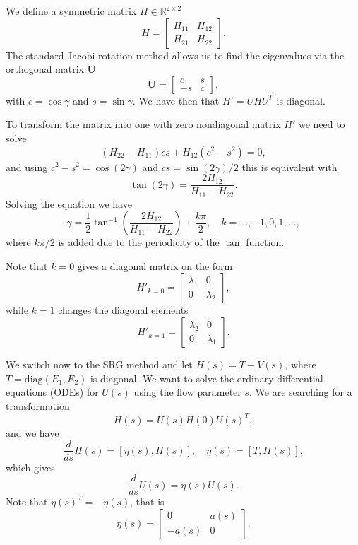 We define a  symmetric matrix  $H\in {\mathbb{R}}^{2\times 2}$
\[ 
H = \begin{bmatrix} H_{11} & H_{12} \\ H_{21} & H_{22}\end{bmatrix}. 
\]
The standard Jacobi rotation method allows us to find the eigenvalues via the orthogonal matrix
$\mathbf{U}$ 
\[ 
\mathbf{U} = \begin{bmatrix} c & s \\ -s & c
\end{bmatrix}, 
\]
with $c = \cos \gamma$ and $s = \sin \gamma$. We have then that  $H' = UHU^T$ is diagonal. 

To transform the matrix into one with zero  nondiagonal matrix $H'$ we need to solve
\[ 
(H_{22} - H_{11})cs + H_{12}(c^2 - s^2) = 0, 
\]
and using $c^2-s^2 = \cos(2\gamma)$ and $cs = \sin(2\gamma)/2$
this is equivalent with 
\[ \tan(2\gamma) = \frac{2 H_{12}}{H_{11}-H_{22}}. \]
Solving the equation we have
\begin{equation} 
\gamma = \frac{1}{2} \tan^{-1} \left( \frac{2H_{12}}{H_{11}-H_{22}}
\right) + \frac{k\pi}{2}, \quad k=\ldots,-1,0,1,\ldots, \label{eq:0} 
\end{equation}
where $k\pi/2$ is added due to the periodicity of the $\tan$ function.

Note that  $k=0$ gives a diagonal matrix on the form
\begin{equation} 
H'_{k=0} = \begin{bmatrix} \lambda_1 & 0 \\ 0 & \lambda_2 \end{bmatrix},
\label{eq:1} 
\end{equation}
while  $k=1$ changes the diagonal elements  
\begin{equation} 
H'_{k=1} = \begin{bmatrix} \lambda_2 & 0 \\ 0 & \lambda_1 \end{bmatrix}.
\label{eq:2}
\end{equation}

We switch now to the SRG method and 
let $H(s) = T + V(s)$, where $T= \mathrm{diag}(E_1,E_2)$ is diagonal. We want to solve the ordinary differential equations (ODEs) 
for $U(s)$ using the flow parameter $s$. 
We are searching for a transformation 
\[ 
H(s) = U(s)H(0)U(s)^T, 
\]
and we have
\[ 
\frac{d}{ds} H(s) = [\eta(s),H(s)],  \quad \eta(s) = [T,H(s)], 
\]
which gives
\[ 
\frac{d}{ds} U(s) = \eta(s) U(s). 
\]
Note that $\eta(s)^T = -\eta(s)$, that is
\[ 
\eta(s) = \begin{bmatrix} 0 & a(s) \\ -a(s) & 0 \end{bmatrix}. 
\]

